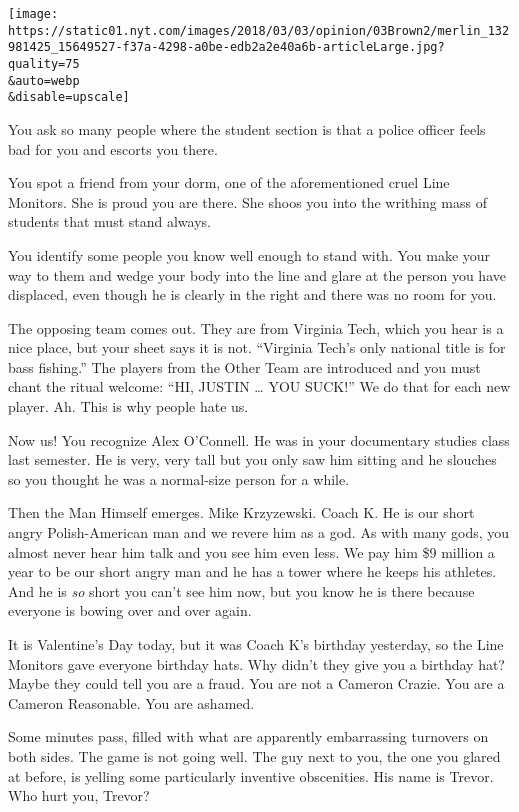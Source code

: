\texttt{[image: https://static01.nyt.com/images/2018/03/03/opinion/03Brown2/merlin\_132981425\_15649527-f37a-4298-a0be-edb2a2e40a6b-articleLarge.jpg?quality=75\\\&auto=webp\\\&disable=upscale]}

You ask so many people where the student section is that a police
officer feels bad for you and escorts you there.

You spot a friend from your dorm, one of the aforementioned cruel Line
Monitors. She is proud you are there. She shoos you into the writhing
mass of students that must stand always.

You identify some people you know well enough to stand with. You make
your way to them and wedge your body into the line and glare at the
person you have displaced, even though he is clearly in the right and
there was no room for you.

The opposing team comes out. They are from Virginia Tech, which you hear
is a nice place, but your sheet says it is not. ``Virginia Tech's only
national title is for bass fishing.'' The players from the Other Team
are introduced and you must chant the ritual welcome: ``HI, JUSTIN
\ldots{} YOU SUCK!'' We do that for each new player. Ah. This is why
people hate us.

Now us! You recognize Alex O'Connell. He was in your documentary studies
class last semester. He is very, very tall but you only saw him sitting
and he slouches so you thought he was a normal-size person for a while.

Then the Man Himself emerges. Mike Krzyzewski. Coach K. He is our short
angry Polish-American man and we revere him as a god. As with many gods,
you almost never hear him talk and you see him even less. We pay him \$9
million a year to be our short angry man and he has a tower where he
keeps his athletes. And he is \emph{so} short you can't see him now, but
you know he is there because everyone is bowing over and over again.

It is Valentine's Day today, but it was Coach K's birthday yesterday, so
the Line Monitors gave everyone birthday hats. Why didn't they give you
a birthday hat? Maybe they could tell you are a fraud. You are not a
Cameron Crazie. You are a Cameron Reasonable. You are ashamed.

Some minutes pass, filled with what are apparently embarrassing
turnovers on both sides. The game is not going well. The guy next to
you, the one you glared at before, is yelling some particularly
inventive obscenities. His name is Trevor. Who hurt you, Trevor?

